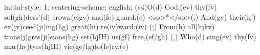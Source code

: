 initial-style: 1;
centering-scheme: english;
(c4)O(d) God,(ev) thy(fv) sol(gh)ders'(d) crown(efgv) and(fe) guard,(e) <sp>*</sp>(,)
And(gv) their(hj) ex(jv)ceed(ji)ing(hg) great(hi) re(iv)ward;(iv) (;)
From(h) all(hjkv) trans(j)gres(ji)sions(hg) set(hjIH) us(gf) free,(ef/gh) (,)
Who(d) sing(ev) thy(fv) mar(hv)tyrs(hjIH) vic(ge/fg)to(fe)ry.(e)
